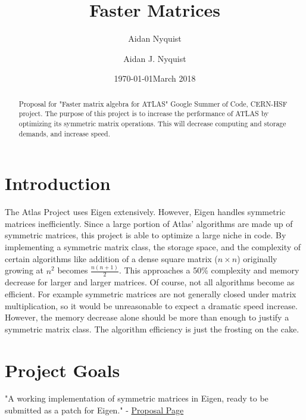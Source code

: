 \documentclass[aps,prl,reprint,groupedaddress,nofootinbib]{revtex4-1}
\author{Aidan Nyquist}
\date{\today}
\title{}
\begin{document}
\begin{abstract}
Proposal for "Faster matrix algebra for ATLAS" Google Summer of Code, CERN-HSF project.
The purpose of this project is to increase the
performance of ATLAS by optimizing its
symmetric matrix operations.
This will decrease computing and storage demands,
and increase speed.

\end{abstract}

\pacs{} \keywords{}
\author{Aidan J. Nyquist}
\date{March 2018}
\title{Faster Matrices}
\maketitle

\section{Introduction}
\label{sec:orgb355bbc}

The Atlas Project uses Eigen extensively.
However, Eigen handles symmetric matrices inefficiently.
Since a large portion of Atlas' algorithms are made up of symmetric matrices,
this project is able to optimize a large niche in code.
By implementing a symmetric matrix class,
the storage space, and the complexity of certain algorithms like addition
of a dense square matrix (\(n \times n\)) originally growing at \(n^2\) becomes \(\frac{n(n+1)}{2}\).
This approaches a 50\% complexity and memory decrease for larger and larger matrices.
Of course, not all algorithms become as efficient.
For example symmetric matrices are not generally closed under matrix multiplication,
so it would be unreasonable to expect a dramatic speed increase.
However, the memory decrease alone should be more than enough to justify 
a symmetric matrix class.
The algorithm efficiency is just the frosting on the cake.

\section{Project Goals}
\label{sec:orgbe592dd}
"A working implementation of symmetric matrices in Eigen,
ready to be submitted as a patch for Eigen." - \href{http://hepsoftwarefoundation.org/gsoc/2018/proposal\_ATLASEigen.html}{Proposal Page}
\end{document}
